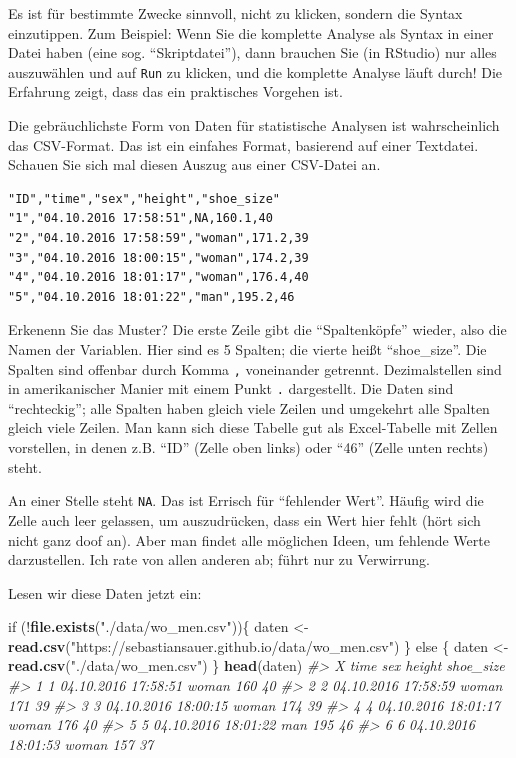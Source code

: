 \documentclass[12pt,]{book}
\makeatletter
\newenvironment{Shaded}{\begin{snugshade}}{\end{snugshade}}
\newcommand{\KeywordTok}[1]{\textcolor[rgb]{0.13,0.29,0.53}{\textbf{{#1}}}}
\newcommand{\StringTok}[1]{\textcolor[rgb]{0.31,0.60,0.02}{{#1}}}
\newcommand{\CommentTok}[1]{\textcolor[rgb]{0.56,0.35,0.01}{\textit{{#1}}}}
\newcommand{\NormalTok}[1]{{#1}}
\newenvironment{kframe}{%
\medskip{}
\setlength{\fboxsep}{.8em}
 \def\at@end@of@kframe{}%
 \ifinner\ifhmode%
  \def\at@end@of@kframe{\end{minipage}}%
  \begin{minipage}{\columnwidth}%
 \fi\fi%
 \def\FrameCommand##1{\hskip\@totalleftmargin \hskip-\fboxsep
 \colorbox{shadecolor}{##1}\hskip-\fboxsep
     \hskip-\linewidth \hskip-\@totalleftmargin \hskip\columnwidth}%
 \MakeFramed {\advance\hsize-\width
   \@totalleftmargin\z@ \linewidth\hsize
   \@setminipage}}%
 {\par\unskip\endMakeFramed%
 \at@end@of@kframe}
\renewenvironment{Shaded}{\begin{kframe}}{\end{kframe}}
\makeatother
\begin{document}
Es ist für bestimmte Zwecke sinnvoll, nicht zu klicken, sondern die
Syntax einzutippen. Zum Beispiel: Wenn Sie die komplette Analyse als
Syntax in einer Datei haben (eine sog. ``Skriptdatei''), dann brauchen
Sie (in RStudio) nur alles auszuwählen und auf \texttt{Run} zu klicken,
und die komplette Analyse läuft durch! Die Erfahrung zeigt, dass das ein
praktisches Vorgehen ist.

Die gebräuchlichste Form von Daten für statistische Analysen ist
wahrscheinlich das CSV-Format. Das ist ein einfahes Format, basierend
auf einer Textdatei. Schauen Sie sich mal diesen Auszug aus einer
CSV-Datei an.

\begin{verbatim}
"ID","time","sex","height","shoe_size"
"1","04.10.2016 17:58:51",NA,160.1,40
"2","04.10.2016 17:58:59","woman",171.2,39
"3","04.10.2016 18:00:15","woman",174.2,39
"4","04.10.2016 18:01:17","woman",176.4,40
"5","04.10.2016 18:01:22","man",195.2,46
\end{verbatim}

Erkenenn Sie das Muster? Die erste Zeile gibt die ``Spaltenköpfe''
wieder, also die Namen der Variablen. Hier sind es 5 Spalten; die vierte
heißt ``shoe\_size''. Die Spalten sind offenbar durch Komma \texttt{,}
voneinander getrennt. Dezimalstellen sind in amerikanischer Manier mit
einem Punkt \texttt{.} dargestellt. Die Daten sind ``rechteckig''; alle
Spalten haben gleich viele Zeilen und umgekehrt alle Spalten gleich
viele Zeilen. Man kann sich diese Tabelle gut als Excel-Tabelle mit
Zellen vorstellen, in denen z.B. ``ID'' (Zelle oben links) oder ``46''
(Zelle unten rechts) steht.

An einer Stelle steht \texttt{NA}. Das ist Errisch für ``fehlender
Wert''. Häufig wird die Zelle auch leer gelassen, um auszudrücken, dass
ein Wert hier fehlt (hört sich nicht ganz doof an). Aber man findet alle
möglichen Ideen, um fehlende Werte darzustellen. Ich rate von allen
anderen ab; führt nur zu Verwirrung.

Lesen wir diese Daten jetzt ein:

\begin{Shaded}
\begin{Highlighting}[]
\NormalTok{if (!}\KeywordTok{file.exists}\NormalTok{(}\StringTok{"./data/wo_men.csv"}\NormalTok{))\{}
  \NormalTok{daten <-}\StringTok{ }\KeywordTok{read.csv}\NormalTok{(}\StringTok{"https://sebastiansauer.github.io/data/wo_men.csv"}\NormalTok{)}
\NormalTok{\} else \{}
  \NormalTok{daten <-}\StringTok{ }\KeywordTok{read.csv}\NormalTok{(}\StringTok{"./data/wo_men.csv"}\NormalTok{)}
\NormalTok{\}}
\KeywordTok{head}\NormalTok{(daten)}
\CommentTok{#>   X                time   sex height shoe_size}
\CommentTok{#> 1 1 04.10.2016 17:58:51 woman    160        40}
\CommentTok{#> 2 2 04.10.2016 17:58:59 woman    171        39}
\CommentTok{#> 3 3 04.10.2016 18:00:15 woman    174        39}
\CommentTok{#> 4 4 04.10.2016 18:01:17 woman    176        40}
\CommentTok{#> 5 5 04.10.2016 18:01:22   man    195        46}
\CommentTok{#> 6 6 04.10.2016 18:01:53 woman    157        37}
\end{Highlighting}
\end{Shaded}
\end{document}
